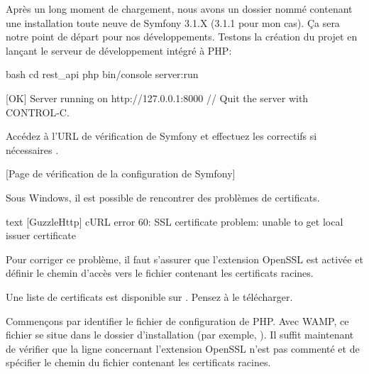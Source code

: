 \documentclass[big]{zmdocument}
\begin{document}
Après un long moment de chargement, nous avons un dossier nommé  contenant une installation toute neuve de Symfony 3.1.X (3.1.1 pour mon cas). Ça sera notre point de départ pour nos développements.
Testons la création du projet en lançant le serveur de développement intégré à PHP:



\begin{CodeBlock}{bash}
cd rest_api
php bin/console server:run

[OK] Server running on http://127.0.0.1:8000
// Quit the server with CONTROL-C.
\end{CodeBlock}



Accédez à l'URL de vérification de Symfony et effectuez les correctifs si nécessaires .



[Page de vérification de la configuration de Symfony]




Sous Windows, il est possible de rencontrer des problèmes de certificats.



\begin{CodeBlock}{text}
[GuzzleHttp\Exception\RequestException]
cURL error 60: SSL certificate problem: unable to get local issuer certificate
\end{CodeBlock}



Pour corriger ce problème, il faut s'assurer que l'extension OpenSSL est activée et définir le chemin d'accès vers le fichier contenant les certificats racines.



Une liste de certificats est disponible sur . Pensez à le télécharger.



Commençons par identifier le fichier de configuration de PHP. Avec WAMP, ce fichier se situe dans le dossier d'installation (par exemple, ). Il suffit maintenant de vérifier que la ligne concernant l'extension OpenSSL n'est pas commenté et de spécifier le chemin du fichier contenant les certificats racines.
\end{document}
